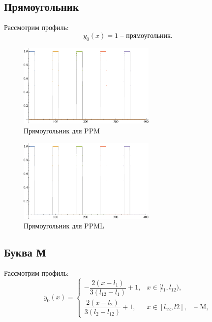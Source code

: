 \documentclass[12pt,a4paper]{article}
\begin{document}
    \pagebreak

    \subsection{Прямоугольник}
    Рассмотрим профиль:
    \[
        y_0(x) = 1 \text{ -- прямоугольник}.
    \]
    
    \begin{figure}[h]
        \centering
        \includegraphics[width=0.6\textwidth]{c=1/h=1./advectionPPM_rectangle.pdf}
        \caption{Прямоугольник для PPM}
        \label{fig:ppm_rectangle}
    \end{figure}

    \begin{figure}[h]
        \centering
        \includegraphics[width=0.6\textwidth]{c=1/h=1./advectionPPML_rectangle.pdf}
        \caption{Прямоугольник для PPML}
        \label{fig:ppm_rectangle}
    \end{figure}

    \pagebreak
    
    \subsection{Буква М}
    Рассмотрим профиль:
    \[
        y_0(x) = \begin{cases}
            -\dfrac{2(x-l_1)}{3(l_{12}-l_1)} + 1, & x \in [l_1, l_{12}), \\[1em]
            \dfrac{2(x-l_{2})}{3(l_2 - l_{12})} + 1, & x \in [l_{12}, l2], \quad \text{-- M},
        \end{cases}
    \]
\end{document}
